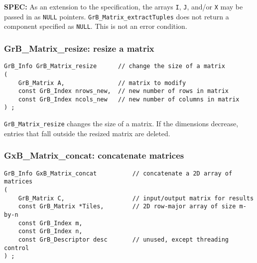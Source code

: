 \documentclass[12pt]{article}
\begin{document}
{\begin{alert}
{\bf SPEC:} As an extension to the specification, the arrays \verb'I', \verb'J', and/or
\verb'X' may be passed in as \verb'NULL' pointers.
\verb'GrB_Matrix_extractTuples' does not return a component specified as
\verb'NULL'.  This is not an error condition.
\end{alert}

\newpage
\subsubsection{{\sf GrB\_Matrix\_resize:}          resize a matrix}
\label{matrix_resize}

\begin{mdframed}[userdefinedwidth=6in]
{\footnotesize
\begin{verbatim}
GrB_Info GrB_Matrix_resize      // change the size of a matrix
(
    GrB_Matrix A,               // matrix to modify
    const GrB_Index nrows_new,  // new number of rows in matrix
    const GrB_Index ncols_new   // new number of columns in matrix
) ;
\end{verbatim} } \end{mdframed}

\verb'GrB_Matrix_resize' changes the size of a matrix.
If the dimensions decrease, entries that fall outside the resized
matrix are deleted.

\subsubsection{{\sf GxB\_Matrix\_concat:} concatenate matrices   }
\label{matrix_concat}

\begin{mdframed}[userdefinedwidth=6in]
{\footnotesize
\begin{verbatim}
GrB_Info GxB_Matrix_concat          // concatenate a 2D array of matrices
(
    GrB_Matrix C,                   // input/output matrix for results
    const GrB_Matrix *Tiles,        // 2D row-major array of size m-by-n
    const GrB_Index m,
    const GrB_Index n,
    const GrB_Descriptor desc       // unused, except threading control
) ;
\end{verbatim} } \end{mdframed}

}
\end{document}
